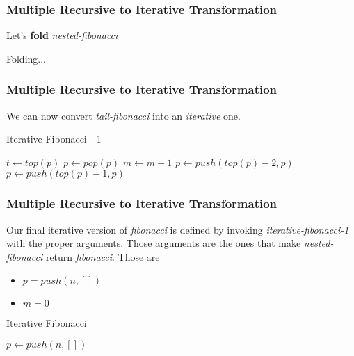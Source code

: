 \documentclass{beamer}
\begin{document}
\begin{frame}
	\frametitle{Multiple Recursive to Iterative Transformation}
	Let's \textbf{fold} \textit{nested-fibonacci}
	\begin{block}{Folding...}
		\tiny
		\begin{algorithmic}[1]
					\State{}
				\Else
						\State{}
					\Else
							\State{}
						\Else
							\State{}
						\EndIf
					\EndIf
				\EndIf
			\EndProcedure
		\end{algorithmic}
	\end{block}
\end{frame}
\begin{frame}
	\frametitle{Multiple Recursive to Iterative Transformation}
	We can now convert \textit{tail-fibonacci} into an \textit{iterative} one.
	\begin{block}{Iterative Fibonacci - 1}
		\begin{algorithmic}[1]
					\State $t \gets top(p)$
					\State $p \gets pop(p)$
						\State $m \gets m+1$
					\Else
						\State $p \gets push(top(p)-2,p)$
						\State $p \gets push(top(p)-1,p)$
					\EndIf
					\EndIf
				\EndWhile
				\State{}
			\EndProcedure
		\end{algorithmic}
	\end{block}
\end{frame}
\begin{frame}
	\frametitle{Multiple Recursive to Iterative Transformation}
	Our final iterative version of \textit{fibonacci} is defined by invoking \textit{iterative-fibonacci-1} with the proper arguments. Those arguments are the ones that make \textit{nested-fibonacci} return \textit{fibonacci}. Those are
	\begin{itemize}
		\item $p = push(n,[])$
		\item $m = 0$
	\end{itemize}
	\begin{block}{Iterative Fibonacci}
		\begin{algorithmic}[1]
				\State $p \gets push(n,[])$
				\State{}
			\EndProcedure
		\end{algorithmic}
	\end{block}
\end{frame}
\end{document}
